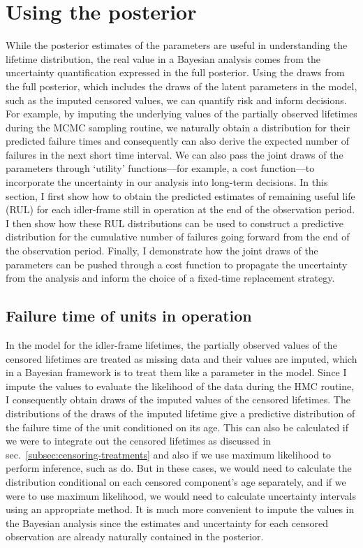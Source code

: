 \section{Using the posterior} \label{sec:idler-frames-using-posterior}

While the posterior estimates of the parameters are useful in understanding the lifetime distribution, the real value in a Bayesian analysis comes from the uncertainty quantification expressed in the full posterior. Using the draws from the full posterior, which includes the draws of the latent parameters in the model, such as the imputed censored values, we can quantify risk and inform decisions. For example, by imputing the underlying values of the partially observed lifetimes during the MCMC sampling routine, we naturally obtain a distribution for their predicted failure times and consequently can also derive the expected number of failures in the next short time interval. We can also pass the joint draws of the parameters through `utility' functions---for example, a cost function---to incorporate the uncertainty in our analysis into long-term decisions. 
In this section, I first show how to obtain the predicted estimates of remaining useful life (RUL) for each idler-frame still in operation at the end of the observation period. I then show how these RUL distributions can be used to construct a predictive distribution for the cumulative number of failures going forward from the end of the observation period. Finally, I demonstrate how the joint draws of the parameters can be pushed through a cost function to propagate the uncertainty from the analysis and inform the choice of a fixed-time replacement strategy.
\marginnote{\small{\textcolor{red}{Add a reference for `utility' function.}}}

\subsection{Failure time of units in operation} \label{subsec:idler-FTs}

In the model for the idler-frame lifetimes, the partially observed values of the censored lifetimes are treated as missing data and their values are imputed, which in a Bayesian framework is to treat them like a parameter in the model. Since I impute the values to evaluate the likelihood of the data during the HMC routine, I consequently obtain draws of the imputed values of the censored lifetimes. The distributions of the draws of the imputed lifetime give a predictive distribution of the failure time of the unit conditioned on its age. This can also be calculated if we were to integrate out the censored lifetimes as discussed in sec.~\ref{subsec:censoring-treatments} and also if we use maximum likelihood to perform inference, such as \citet{hong2009} do. But in these cases, we would need to calculate the distribution conditional on each censored component's age separately, and if we were to use maximum likelihood, we would need to calculate uncertainty intervals using an appropriate method. It is much more convenient to impute the values in the Bayesian analysis since the estimates and uncertainty for each censored observation are already naturally contained in the posterior.

